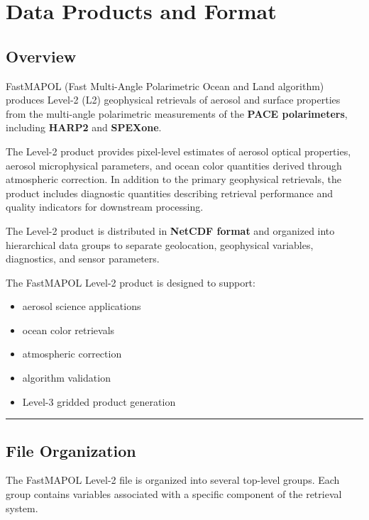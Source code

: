 \documentclass[
  11pt,
  letterpaper,
  DIV=11,
  numbers=noendperiod]{scrreprt}
\providecommand{\tightlist}{%
  \setlength{\itemsep}{0pt}\setlength{\parskip}{0pt}}
\begin{document}

\chapter{Data Products and Format}\label{data-products-and-format}

\section{Overview}\label{overview}

FastMAPOL (Fast Multi-Angle Polarimetric Ocean and Land algorithm)
produces Level-2 (L2) geophysical retrievals of aerosol and surface
properties from the multi-angle polarimetric measurements of the
\textbf{PACE polarimeters}, including \textbf{HARP2} and
\textbf{SPEXone}.

The Level-2 product provides pixel-level estimates of aerosol optical
properties, aerosol microphysical parameters, and ocean color quantities
derived through atmospheric correction. In addition to the primary
geophysical retrievals, the product includes diagnostic quantities
describing retrieval performance and quality indicators for downstream
processing.

The Level-2 product is distributed in \textbf{NetCDF format} and
organized into hierarchical data groups to separate geolocation,
geophysical variables, diagnostics, and sensor parameters.

The FastMAPOL Level-2 product is designed to support:

\begin{itemize}
\tightlist
\item
  aerosol science applications
\item
  ocean color retrievals
\item
  atmospheric correction
\item
  algorithm validation
\item
  Level-3 gridded product generation
\end{itemize}

\begin{center}\rule{0.5\linewidth}{0.5pt}\end{center}

\section{File Organization}\label{file-organization}

The FastMAPOL Level-2 file is organized into several top-level groups.
Each group contains variables associated with a specific component of
the retrieval system.
\end{document}
